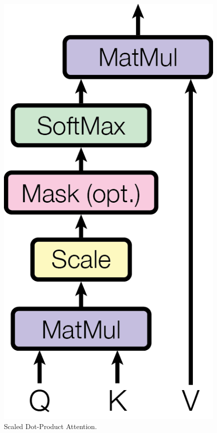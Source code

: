 \begin{figure}
\begin{minipage}[b]{0.5\textwidth}
    \centering
    \includegraphics[scale=0.7]{images/ModalNet-19}
    \caption{Scaled Dot-Product Attention.}
    \label{fig:dot-att}
  \end{minipage}
\end{figure}

